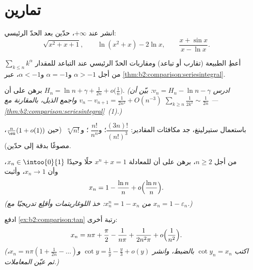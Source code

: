 \section{تمارين}

\begin{exercise}[$\star$]\label{exo:b2:comparison:1}
انشر عند $+\infty$، حدّين بعد الحدّ الرئيسي:
\[
\sqrt{x^2 + x + 1} ,
\qquad
\ln(x^2 + x) - 2\ln x,
\qquad
\frac{x + \sin x}{x - \ln x} .
\]
\end{exercise}

\begin{exercise}[$\star$]\label{exo:b2:comparison:2}
أعطِ الطبيعة (تقارب أو تباعد) ومقاربات الحدّ الرئيسي عند
التباعد للمقدار $\sum_{k \leq n} k^\alpha$ من أجل $\alpha >
-1$ و$\alpha = -1$ و$\alpha < -1$، عبر
\cref{thm:b2:comparison:seriesintegral}.
\end{exercise}

\begin{exercise}[$\star\star$]\label{exo:b2:comparison:3}
برهن على أن $H_n = \ln n + \gamma + \frac{1}{2n} + o\bigl(\frac1n\bigr)$.
\emph{(ادرس $v_n = H_n - \ln n - \gamma$: بيّن أن $v_n - v_{n+1} =
\frac{1}{2n^2} + O(n^{-3})$ واجمع الذيل، بالمقارنة مع
$\sum_{k \geq n} \frac{1}{2k^2} \sim \frac{1}{2n}$ ---
\cref{thm:b2:comparison:seriesintegral}~(1).)}
\end{exercise}

\begin{exercise}[$\star\star$]\label{exo:b2:comparison:4}
باستعمال ستيرلينغ، جد مكافئات المقادير: $\dfrac{(3n)!}{(n!)^3}$؛
و$\;\dfrac{n!}{n^n}$؛ و$\;\sqrt[n]{n!}$ (حين $\frac n\eu(1 + o(1))$،
مصوغًا بدقة إلى حدّين).
\end{exercise}

\begin{exercise}[$\star\star$]\label{exo:b2:comparison:5}
من أجل $n \geq 2$، برهن على أن للمعادلة $x^n + x = 1$ حلًا وحيدًا $x_n
\in \intoo{0}{1}$، وأن $x_n \to 1$، وأثبت
\[
x_n = 1 - \frac{\ln n}{n} + o\Bigl(\frac{\ln n}{n}\Bigr).
\]
\emph{(من $x_n^n = 1 - x_n$: خذ اللوغاريتمات وأقلِع تدريجيًا مع
$x_n = 1 - \varepsilon_n$.)}
\end{exercise}

\begin{exercise}[$\star\star$]\label{exo:b2:comparison:6}
ادفع \cref{ex:b2:comparison:tan} رتبة أخرى:
\[
x_n = n\pi + \frac\pi2 - \frac{1}{n\pi} + \frac{1}{2n^2\pi} +
o\Bigl(\frac{1}{n^2}\Bigr).
\]
\emph{(اكتب $\cot y_n = x_n$ بالضبط، وانشر $\cot y = \frac1y -
\frac y3 + o(y)$ و$x_n = n\pi(1 + \frac{1}{2n} - \dots)$، ثم
عيّن المعاملات.)}
\end{exercise}


